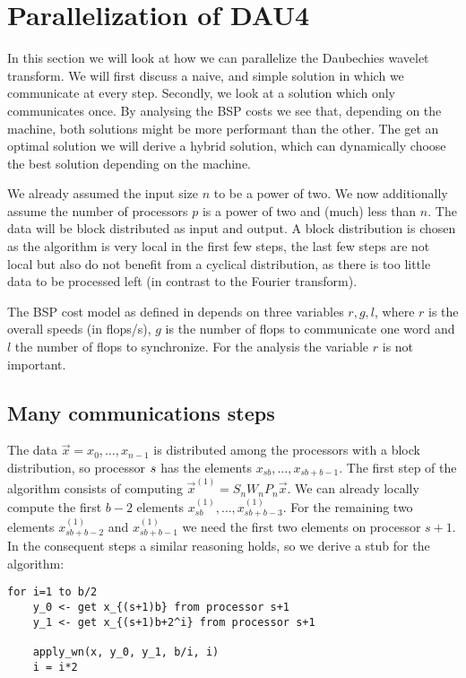 
\section{Parallelization of DAU4}
\label{sec:par}

In this section we will look at how we can parallelize the Daubechies wavelet transform. We will first discuss a naive, and simple solution in which we communicate at every step. Secondly, we look at a solution which only communicates once. By analysing the BSP costs we see that, depending on the machine, both solutions might be more performant than the other. The get an optimal solution we will derive a hybrid solution, which can dynamically choose the best solution depending on the machine.

We already assumed the input size $n$ to be a power of two. We now additionally assume the number of processors $p$ is a power of two and (much) less than $n$. The data will be block distributed as input and output. A block distribution is chosen as the algorithm is very local in the first few steps, the last few steps are not local but also do not benefit from a cyclical distribution, as there is too little data to be processed left (in contrast to the Fourier transform).

The BSP cost model as defined in \cite{biss} depends on three variables $r, g, l$, where $r$ is the overall speeds (in flops/s), $g$ is the number of flops to communicate one word and $l$ the number of flops to synchronize. For the analysis the variable $r$ is not important.

\subsection{Many communications steps}
The data $\vec{x} = x_0, \ldots, x_{n-1}$ is distributed among the processors with a block distribution, so processor $s$ has the elements $x_{sb}, \ldots, x_{sb+b-1}$. The first step of the algorithm consists of computing $\vec{x}^{(1)} = S_n W_n P_n \vec{x}$. We can already locally compute the first $b-2$ elements $x^{(1)}_{sb}, \ldots, x^{(1)}_{sb+b-3}$. For the remaining two elements $x^{(1)}_{sb+b-2}$ and $x^{(1)}_{sb+b-1}$ we need the first two elements on processor $s+1$. In the consequent steps a similar reasoning holds, so we derive a stub for the algorithm:

\begin{lstlisting}
for i=1 to b/2
	y_0 <- get x_{(s+1)b} from processor s+1
	y_1 <- get x_{(s+1)b+2^i} from processor s+1

	apply_wn(x, y_0, y_1, b/i, i)
	i = i*2
\end{lstlisting}

